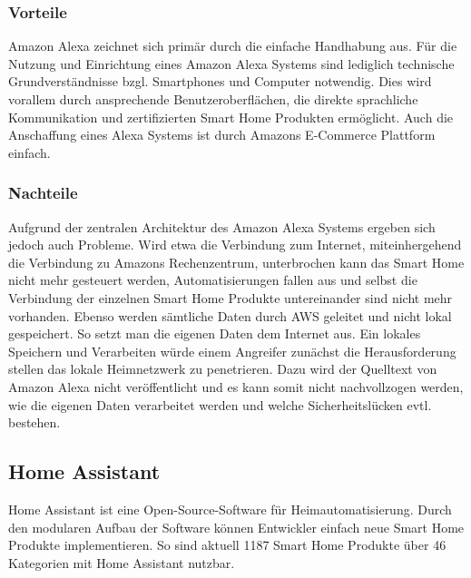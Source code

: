 
\subsubsection{Vorteile}

Amazon Alexa zeichnet sich primär durch die einfache Handhabung aus.
Für die Nutzung und Einrichtung eines Amazon Alexa Systems sind lediglich technische Grundverständnisse bzgl. Smartphones und Computer notwendig.
Dies wird vorallem durch ansprechende Benutzeroberflächen, die direkte sprachliche Kommunikation und zertifizierten Smart Home Produkten ermöglicht.
Auch die Anschaffung eines Alexa Systems ist durch Amazons E-Commerce Plattform einfach.

\subsubsection{Nachteile}

Aufgrund der zentralen Architektur des Amazon Alexa Systems ergeben sich jedoch auch Probleme.
Wird etwa die Verbindung zum Internet, miteinhergehend die Verbindung zu Amazons Rechenzentrum, unterbrochen kann das Smart Home nicht mehr gesteuert werden, Automatisierungen fallen aus und selbst die Verbindung der einzelnen Smart Home Produkte untereinander sind nicht mehr vorhanden.
Ebenso werden sämtliche Daten durch \ac{AWS} geleitet und nicht lokal gespeichert.
So setzt man die eigenen Daten dem Internet aus.
Ein lokales Speichern und Verarbeiten würde einem Angreifer zunächst die Herausforderung stellen das lokale Heimnetzwerk zu penetrieren.
Dazu wird der Quelltext von Amazon Alexa nicht veröffentlicht und es kann somit nicht nachvollzogen werden, wie die eigenen Daten verarbeitet werden und welche Sicherheitslücken evtl. bestehen.

\subsection{Home Assistant}

Home Assistant ist eine Open-Source-Software für Heimautomatisierung.
Durch den modularen Aufbau der Software können Entwickler einfach neue Smart Home Produkte implementieren.
So sind aktuell 1187 Smart Home Produkte über 46 Kategorien mit Home Assistant nutzbar.

